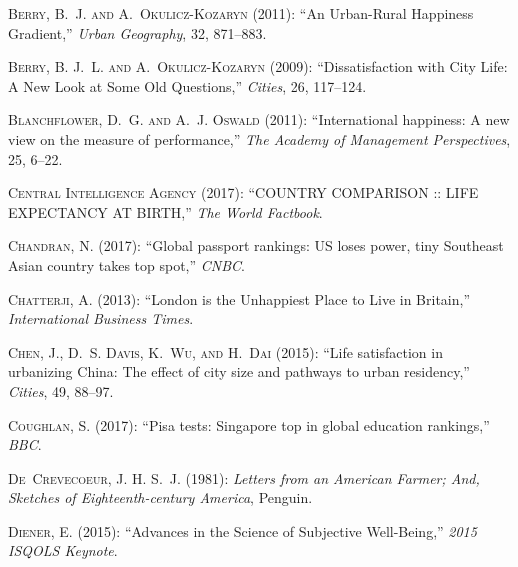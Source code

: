 \documentclass[10pt, letterpaper]{article}
\begin{document}
\begin{spacing}{2.0}
\begin{thebibliography}{115}
\textsc{Berry, B.~J. and A.~Okulicz-Kozaryn} (2011): \enquote{An Urban-Rural
  Happiness Gradient,} \emph{Urban Geography}, 32, 871--883.

\textsc{Berry, B. J.~L. and A.~Okulicz-Kozaryn} (2009):
  \enquote{Dissatisfaction with City Life: A New Look at Some Old Questions,}
  \emph{Cities}, 26, 117--124.

\textsc{Blanchflower, D.~G. and A.~J. Oswald} (2011): \enquote{International
  happiness: A new view on the measure of performance,} \emph{The Academy of
  Management Perspectives}, 25, 6--22.

\textsc{{Central Intelligence Agency}} (2017): \enquote{COUNTRY COMPARISON ::
  LIFE EXPECTANCY AT BIRTH,} \emph{The World Factbook}.

\textsc{Chandran, N.} (2017): \enquote{Global passport rankings: US loses
  power, tiny Southeast Asian country takes top spot,} \emph{CNBC}.

\textsc{Chatterji, A.} (2013): \enquote{London is the Unhappiest Place to Live
  in Britain,} \emph{International Business Times}.

\textsc{Chen, J., D.~S. Davis, K.~Wu, and H.~Dai} (2015): \enquote{Life
  satisfaction in urbanizing China: The effect of city size and pathways to
  urban residency,} \emph{Cities}, 49, 88--97.

\textsc{Coughlan, S.} (2017): \enquote{Pisa tests: Singapore top in global
  education rankings,} \emph{BBC}.

\textsc{De~Crevecoeur, J. H. S.~J.} (1981): \emph{Letters from an American
  Farmer; And, Sketches of Eighteenth-century America}, Penguin.

\textsc{Diener, E.} (2015): \enquote{Advances in the Science of Subjective
  Well-Being,} \emph{2015 ISQOLS Keynote}.


\end{thebibliography}
\end{spacing}
\end{document}
